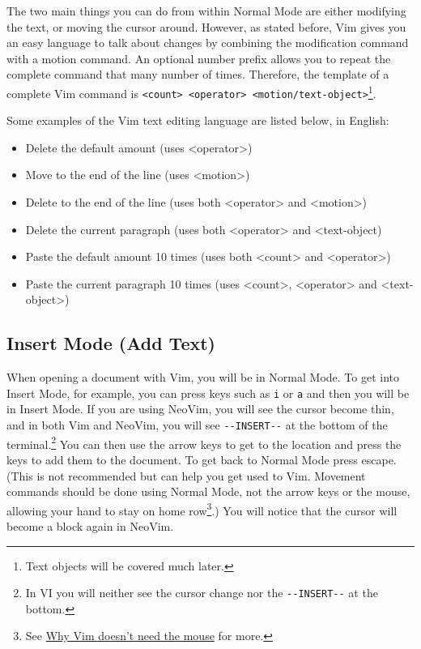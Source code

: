 \documentclass[11pt]{article}
\begin{document}
The two main things you can do from within Normal Mode are either modifying the
text, or moving the cursor around. However, as stated before, Vim gives you
an easy language to talk about changes by combining the modification command
with a motion command. An optional number prefix allows you to repeat the
complete command that many number of times. Therefore, the template of a
complete Vim command is \texttt{<count> <operator> <motion/text-object>}\footnote{Text objects will be covered much later.}.

Some examples of the Vim text editing language are listed below, in English:
\begin{itemize}
\item Delete the default amount (uses <operator>)
\item Move to the end of the line (uses <motion>)
\item Delete to the end of the line (uses both <operator> and <motion>)
\item Delete the current paragraph (uses both <operator> and <text-object)
\item Paste the default amount 10 times (uses both <count> and <operator>)
\item Paste the current paragraph 10 times (uses <count>, <operator> and <text-object>)
\end{itemize}
\subsection{Insert Mode (Add Text)}
\label{sec:orgea49134}
When opening a document with Vim, you will be in Normal Mode. To get into Insert
Mode, for example, you can press keys such as \texttt{i} or \texttt{a} and then you will be in
Insert Mode. If you are using NeoVim, you will see the cursor become thin, and
in both Vim and NeoVim, you will see \texttt{-{}-INSERT-{}-} at the bottom of the
terminal.\footnote{In VI you will neither see the cursor change nor the 
\texttt{-{}-INSERT-{}-} at the bottom.} You can then use the arrow keys to get to the location and press
the keys to add them to the document. To get back to Normal Mode press escape.
(This is not recommended but can help you get used to Vim. Movement commands
should be done using Normal Mode, not the arrow keys or the mouse, allowing your
hand to stay on home row\footnote{See \href{https://www.youtube.com/watch?v=tQCRVkSFFEc}{Why Vim doesn't need the mouse} for more.}.) You will notice that the cursor will become a block
again in NeoVim.
\end{document}
